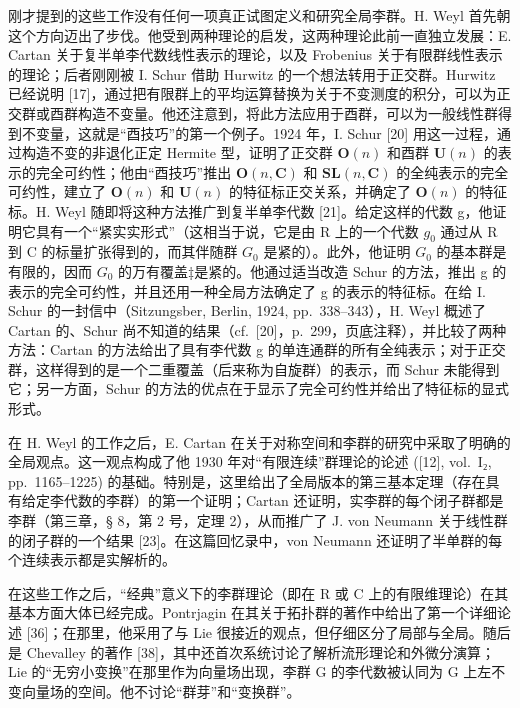刚才提到的这些工作没有任何一项真正试图定义和研究全局李群。H. Weyl 首先朝这个方向迈出了步伐。他受到两种理论的启发，这两种理论此前一直独立发展：E. Cartan 关于复半单李代数线性表示的理论，以及 Frobenius 关于有限群线性表示的理论；后者刚刚被 I. Schur 借助 Hurwitz 的一个想法转用于正交群。Hurwitz 已经说明 {[}17{]}，通过把有限群上的平均运算替换为关于不变测度的积分，可以为正交群或酉群构造不变量。他还注意到，将此方法应用于酉群，可以为一般线性群得到不变量，这就是“酉技巧”的第一个例子。1924 年，I. Schur {[}20{]} 用这一过程，通过构造不变的非退化正定 Hermite 型，证明了正交群 \(\mathbf{O}(n)\) 和酉群 \(\mathbf{U}(n)\) 的表示的完全可约性；他由“酉技巧”推出 \(\mathbf{O}(n,\mathbf{C})\) 和 \(\mathbf{SL}(n,\mathbf{C})\) 的全纯表示的完全可约性，建立了 \(\mathbf{O}(n)\) 和 \(\mathbf{U}(n)\) 的特征标正交关系，并确定了 \(\mathbf{O}(n)\) 的特征标。H. Weyl 随即将这种方法推广到复半单李代数 {[}21{]}。给定这样的代数 g，他证明它具有一个“紧实实形式”（这相当于说，它是由 R 上的一个代数 \(g_{0}\) 通过从 R 到 C 的标量扩张得到的，而其伴随群 \(G_{0}\) 是紧的）。此外，他证明 \(G_{0}\) 的基本群是有限的，因而 \(G_{0}\) 的万有覆盖‡是紧的。他通过适当改造 Schur 的方法，推出 g 的表示的完全可约性，并且还用一种全局方法确定了 g 的表示的特征标。在给 I. Schur 的一封信中（Sitzungsber, Berlin, 1924, pp.~338--343），H. Weyl 概述了 Cartan 的、Schur 尚不知道的结果（cf.~{[}20{]}，p.~299，页底注释），并比较了两种方法：Cartan 的方法给出了具有李代数 g 的单连通群的所有全纯表示；对于正交群，这样得到的是一个二重覆盖（后来称为自旋群）的表示，而 Schur 未能得到它；另一方面，Schur 的方法的优点在于显示了完全可约性并给出了特征标的显式形式。

在 H. Weyl 的工作之后，E. Cartan 在关于对称空间和李群的研究中采取了明确的全局观点。这一观点构成了他 1930 年对“有限连续”群理论的论述 ({[}12{]}, vol.~I₂, pp.~1165--1225) 的基础。特别是，这里给出了全局版本的第三基本定理（存在具有给定李代数的李群）的第一个证明；Cartan 还证明，实李群的每个闭子群都是李群（第三章，§ 8，第 2 号，定理 2），从而推广了 J. von Neumann 关于线性群的闭子群的一个结果 {[}23{]}。在这篇回忆录中，von Neumann 还证明了半单群的每个连续表示都是实解析的。

在这些工作之后，“经典”意义下的李群理论（即在 R 或 C 上的有限维理论）在其基本方面大体已经完成。Pontrjagin 在其关于拓扑群的著作中给出了第一个详细论述 {[}36{]}；在那里，他采用了与 Lie 很接近的观点，但仔细区分了局部与全局。随后是 Chevalley 的著作 {[}38{]}，其中还首次系统讨论了解析流形理论和外微分演算；Lie 的“无穷小变换”在那里作为向量场出现，李群 G 的李代数被认同为 G 上左不变向量场的空间。他不讨论“群芽”和“变换群”。

